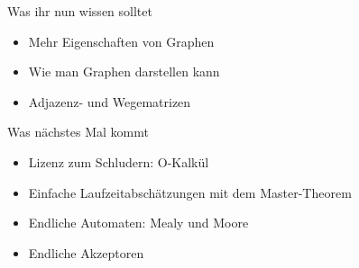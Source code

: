 
%

\begin{frame}	
	\begin{block}{Was ihr nun wissen solltet}
		\begin{itemize}
			\item Mehr Eigenschaften von Graphen
			\item Wie man Graphen darstellen kann
			\item Adjazenz- und Wegematrizen %
		\end{itemize}
	\end{block}
	
	\begin{block}{Was nächstes Mal kommt}
		\begin{itemize}
			\item Lizenz zum Schludern: O-Kalkül
			\item Einfache Laufzeitabschätzungen mit dem Master-Theorem
			\item Endliche Automaten: Mealy und Moore
			\item Endliche Akzeptoren
		\end{itemize}
	\end{block}
\end{frame}

\slideThanks

